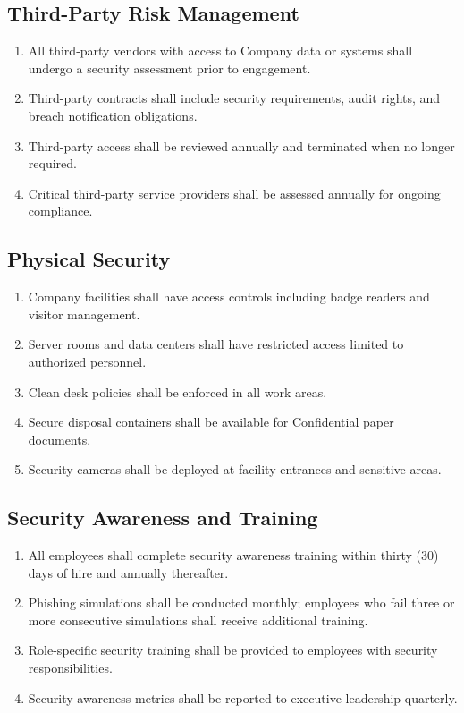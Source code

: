 \documentclass[
    language=english,
    doctype=policy-document,
    institution=none,
]{../../omnilatex}
\begin{document}
\subsection{Third-Party Risk Management}

\begin{enumerate}[label=\textbf{\arabic*.}]
    \item All third-party vendors with access to Company data or systems shall undergo a security assessment prior to engagement.
    \item Third-party contracts shall include security requirements, audit rights, and breach notification obligations.
    \item Third-party access shall be reviewed annually and terminated when no longer required.
    \item Critical third-party service providers shall be assessed annually for ongoing compliance.
\end{enumerate}

\subsection{Physical Security}

\begin{enumerate}[label=\textbf{\arabic*.}]
    \item Company facilities shall have access controls including badge readers and visitor management.
    \item Server rooms and data centers shall have restricted access limited to authorized personnel.
    \item Clean desk policies shall be enforced in all work areas.
    \item Secure disposal containers shall be available for Confidential paper documents.
    \item Security cameras shall be deployed at facility entrances and sensitive areas.
\end{enumerate}

\subsection{Security Awareness and Training}

\begin{enumerate}[label=\textbf{\arabic*.}]
    \item All employees shall complete security awareness training within thirty (30) days of hire and annually thereafter.
    \item Phishing simulations shall be conducted monthly; employees who fail three or more consecutive simulations shall receive additional training.
    \item Role-specific security training shall be provided to employees with security responsibilities.
    \item Security awareness metrics shall be reported to executive leadership quarterly.
\end{enumerate}
\end{document}
